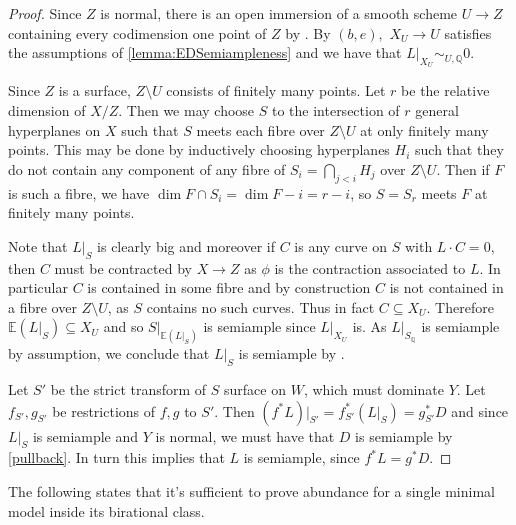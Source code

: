 	\begin{proof}
		
		Since $Z$ is normal, there is an open immersion of a smooth scheme $U \to Z$ containing every codimension one point of $Z$ by \cite[Tag 0ADD]{stacks-project}. By $(b,e),$ $X_{U} \to U$ satisfies the assumptions of \autoref{lemma:EDSemiampleness} and we have that $L|_{X_{U}} \sim_{U,\mathbb{Q}} 0$. 
		
		Since $Z$ is a surface, $Z \setminus U$ consists of finitely many points. Let $r$ be the relative dimension of $X/Z$. Then we may choose $S$ to the intersection of $r$ general hyperplanes on $X$ such that $S$ meets each fibre over $Z \setminus U$ at only finitely many points. This may be done by inductively choosing hyperplanes $H_{i}$ such that they do not contain any component of any fibre of $S_{i}=\bigcap_{j< i} H_{j}$ over $Z\setminus U$. Then if $F$ is such a fibre, we have $\dim F\cap S_{i}=\dim F-i=r-i$, so $S=S_{r}$ meets $F$ at finitely many points.
		
		Note that $L|_{S}$ is clearly big and moreover if $C$ is any curve on $S$ with $L \cdot C =0$, then $C$ must be contracted by $X \to Z$ as $\phi$ is the contraction associated to $L$. In particular $C$ is contained in some fibre and by construction $C$ is not contained in a fibre over $Z \setminus U$, as $S$ contains no such curves. Thus in fact $C \subseteq X_{U}$. Therefore $\mathbb{E}(L|_{S}) \subseteq X_{U}$ and so $S|_{\mathbb{E}(L|_{S})}$ is semiample since $L|_{X_{U}}$ is. As $L|_{S_{\mathbb{Q}}}$ is semiample by assumption, we conclude that $L|_{S}$ is semiample by \cite[Theorem 6.1]{witaszek2020keels}. 
		
		Let $S'$ be the strict transform of $S$ surface on $W$, which must dominate $Y$. Let $f_{S'}, g_{S'}$ be restrictions of $f,g$ to $S'$. Then $(f^{*}L)|_{S'}=f_{S'}^{*}(L|_{S})=g_{S'}^{*}D$ and since $L|_{S}$ is semiample and $Y$ is normal, we must have that $D$ is semiample by \autoref{pullback}. In turn this implies that $L$ is semiample, since $f^{*}L=g^{*}D$.			
	\end{proof}
	
	The following states that it's sufficient to prove abundance for a single minimal model inside its birational class.
	

